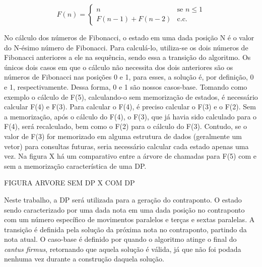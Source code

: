       \[ F(n) = \left\{ \begin{array}{ll}
         n & \mbox{se $n \leqslant 1$}\\
        F(n-1) + F(n-2) & \mbox{c.c.}\end{array} \right. \]

      No cálculo dos números de Fibonacci, o estado em uma dada posição N é o valor do N-ésimo número de Fibonacci. Para calculá-lo, utiliza-se os dois números de Fibonacci anteriores a ele na sequência, sendo essa a transição do algoritmo. Os únicos dois casos em que o cálculo não necessita dos dois anteriores são os números de Fibonacci nas posições 0 e 1, para esses, a solução é, por definição, 0 e 1, respectivamente. Dessa forma, 0 e 1 são nossos casos-base. Tomando como exemplo o cálculo de F(5), calculando-o sem memorização de estados, é necessário calcular F(4) e F(3). Para calcular o F(4), é preciso calcular o F(3) e o F(2). Sem a memorização, após o cálculo do F(4), o F(3), que já havia sido calculado para o F(4), será recalculado, bem como o F(2) para o cálculo do F(3). Contudo, se o valor de F(3) for memorizado em alguma estrutura de dados (geralmente um vetor) para consultas futuras, seria necessário calcular cada estado apenas uma vez. Na figura X há um comparativo entre a árvore de chamadas para F(5) com e sem a memorização característica de uma DP.

      FIGURA ARVORE SEM DP X COM DP

      Neste trabalho, a DP será utilizada para a geração do contraponto. O estado sendo caracterizado por uma dada nota em uma dada posição no contraponto com um número específico de movimentos paralelos e terças e sextas paralelas. A transição é definida pela solução da próxima nota no contraponto, partindo da nota atual. O caso-base é definido por quando o algoritmo atinge o final do \textit{cantus firmus}, retornando que aquela solução é válida, já que não foi podada nenhuma vez durante a construção daquela solução.
